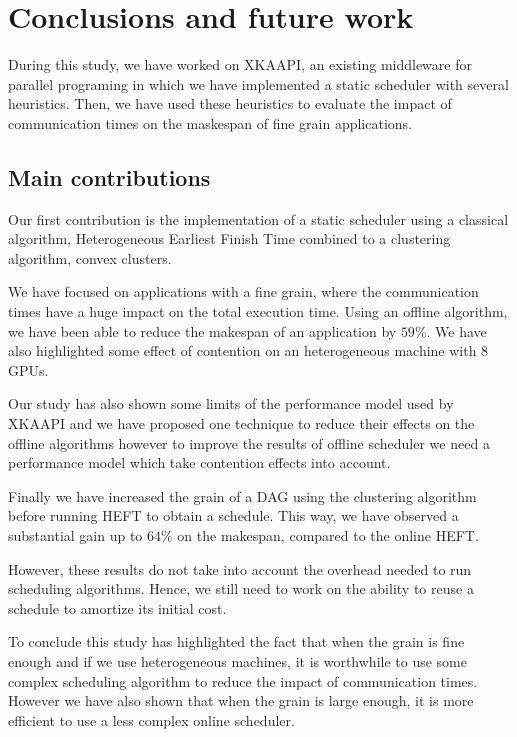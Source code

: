 \documentclass[10pt, conference, compsocconf,pdftex,dvipsnames]{IEEEtran}
\begin{document}
\section{Conclusions and future work}
\label{sec:cncl}
During this study, we have worked on
XKAAPI\cite{gautier2007kaapi,gautierxkaapi}, an existing middleware for
parallel programing in which we have implemented a static scheduler with
several heuristics. Then, we have used these heuristics to evaluate the impact
of communication times on the maskespan of fine grain applications.

\subsection{Main contributions}
\label{chap:cncl-contrib}

Our first contribution is the implementation of a static scheduler using
a classical algorithm, Heterogeneous Earliest Finish Time combined to a
clustering algorithm, convex clusters.

We have focused on applications with a fine grain, where the communication
times have a huge impact on the total execution time. Using an offline
algorithm, we have been able to reduce the makespan of an application by
$59\%$. We have also highlighted some effect of contention on an heterogeneous
machine with 8 GPUs. 

Our study has also shown some limits of the performance model used by XKAAPI
and we have proposed one technique to reduce their effects on the offline
algorithms however to improve the results of offline scheduler we need a
performance model which take contention effects into account.

Finally we have increased the grain of a DAG using the clustering algorithm
before running HEFT to obtain a schedule. This way, we have observed a
substantial gain up to $64\%$ on the makespan, compared to the online HEFT.

However, these results do not take into account the overhead needed to run
scheduling algorithms. Hence, we still need to work on the ability to reuse a
schedule to amortize its initial cost. 

To conclude this study has highlighted the fact that when the grain is fine
enough and if we use heterogeneous machines, it is worthwhile to use some 
complex scheduling algorithm to reduce the impact of communication times.
However we have also shown that when the grain is large enough, it is more
efficient to use a less complex online scheduler.
\end{document}
